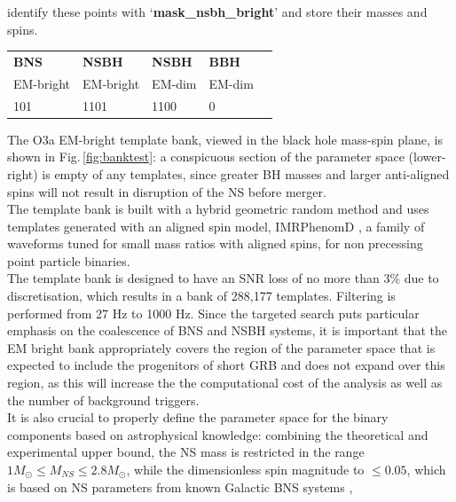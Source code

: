 \documentclass[binding=0.6cm, LaM]{sapthesis}
\begin{document}
        identify these points with ‘\textbf{{\color{blue}mask\_nsbh\_bright}}’ and store their masses and spins.
\begin{table}[H]
\noindent
\begin{tabular}{|l|l|l|l|l|} \hline
\textbf{BNS}  & \textbf{NSBH}       & \textbf{NSBH}    & \textbf{BBH}     \\
EM-bright     & EM-bright  & EM-dim  & EM-dim  \\\hline
{\color{red}1}0{\color{green}1}  & {\color{red}1}1{\color{green}0}{\color{blue}1}  & {\color{red}1}1{\color{green}0}{\color{blue}0}  & {\color{red}0}  \\ \hline
\end{tabular}
\end{table}
		
	The O3a EM-bright template bank, viewed in the black hole mass-spin plane, is shown in Fig.\,\ref{fig:banktest}:
        a conspicuous section of the parameter space (lower-right) is empty of any templates,
        since greater BH masses and larger anti-aligned spins will not result in disruption of the NS before merger.\\ 
        The template bank is built with a hybrid geometric random method and uses templates generated with an aligned spin model,
        IMRPhenomD \cite{156}, a family of waveforms tuned for small mass ratios with aligned spins,                                                                                                        
        for non precessing point particle binaries.\\
	The template bank is designed to have an SNR loss of no more than 3\% due to discretisation, 
	which results in a bank of 288,177  templates. Filtering is performed from 27 Hz to 1000 Hz. 	
	Since the targeted search puts particular emphasis on the coalescence of  BNS and NSBH systems,
	it is important that the EM bright bank appropriately covers the region of the parameter space 
	that is expected to include the progenitors of short GRB and does not expand over this region,
	as this will increase the the computational cost of the analysis as well as the number of background triggers. \\ 
	It is also crucial to properly define the parameter space for the binary components based on astrophysical knowledge:
	combining the theoretical and experimental upper bound, the NS mass is restricted in the range $1M_\odot \leq M_{NS}  \leq 2.8M_\odot$,
	while the dimensionless spin magnitude to $\leq 0.05$, which is based on NS parameters from known Galactic BNS systems \cite{155},
\end{document}
